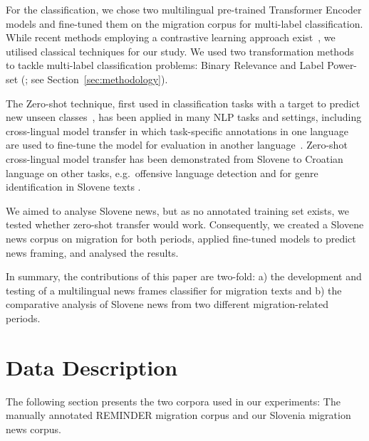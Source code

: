 \documentclass[10pt, a4paper]{article}
\begin{document}
For the classification, we chose two multilingual pre-trained Transformer Encoder \cite{devlin2018, conneau2019} models and fine-tuned them on the migration corpus for multi-label classification.
While recent methods employing a contrastive learning approach exist~\citep{reiter-haas-etal-2023-mcpt, liao-etal-2023-marseclipse}, we utilised classical techniques for our study.
We used two transformation methods to tackle multi-label classification problems: Binary Relevance and Label Power-set (\citealp{ganda_survey_2018}; see Section~\ref{sec:methodology}).

The Zero-shot technique, first used in classification tasks with a target to predict new unseen classes~\citep{chang2008zero, larochelle2008zero, palatucci2009zero}, has been applied in many NLP tasks and settings, including cross-lingual model transfer in which task-specific annotations in one language are used to fine-tune the model for evaluation in another language~\citep{pires2019multilingual}. 
Zero-shot cross-lingual model transfer has been demonstrated from Slovene to Croatian language on other tasks, e.g.\ offensive language detection \citep{pelicon2020zero} and for genre identification in Slovene texts \citep{kuzman2023chatgpt}.

We aimed to analyse Slovene news, but as no annotated training set exists, we tested whether zero-shot transfer would work.
Consequently, we created a Slovene news corpus on migration for both periods, applied fine-tuned models to predict news framing, and analysed the results.

In summary, the contributions of this paper are two-fold: a) the development and testing of a multilingual news frames classifier for migration texts and b) the comparative analysis of Slovene news from two different migration-related periods. 

\section{Data Description}
\label{sec:data_descr}
The following section presents the two corpora used in our experiments: The manually annotated REMINDER migration corpus and our Slovenia migration news corpus.
\end{document}
